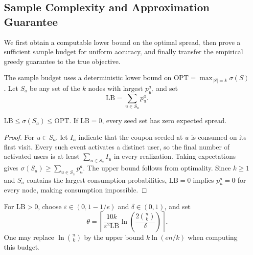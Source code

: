 \documentclass[sigconf]{acmart}
\begin{document}
\subsection{Sample Complexity and Approximation Guarantee}
\label{sec:theoretical-guarantees}

We first obtain a computable lower bound on the optimal spread,
then prove a sufficient sample budget for uniform accuracy, and
finally transfer the empirical greedy guarantee to the true objective.

The sample budget uses a deterministic lower bound on
$\mathrm{OPT}=\max_{|S|=k}\sigma(S)$. Let $S_a$ be any set of
the $k$ nodes with largest $p_u^a$, and set
\begin{equation}
\label{eq:opt-lower-bound}
  \mathrm{LB}=\sum_{u\in S_a}p_u^a.
\end{equation}

\begin{lemma}
\label{lem:lower-bound}
$\mathrm{LB}\le\sigma(S_a)\le\mathrm{OPT}$.
If $\mathrm{LB}=0$, every seed set has zero expected spread.
\end{lemma}
\begin{proof}\renewcommand{\qedsymbol}{}
For $u\in S_a$, let $I_u$ indicate that the coupon seeded at $u$
is consumed on its first visit. Every such event activates a
distinct user, so the final number of activated users is at least
$\sum_{u\in S_a}I_u$ in every realization.
Taking expectations gives $\sigma(S_a)\ge\sum_{u\in S_a}p_u^a$.
The upper bound follows from optimality. Since $k\ge1$ and $S_a$
contains the largest consumption probabilities, $\mathrm{LB}=0$
implies $p_u^a=0$ for every node, making consumption impossible.
\end{proof}

For $\mathrm{LB}>0$, choose $\varepsilon\in(0,1-1/e)$ and
$\delta\in(0,1)$, and set
\begin{equation}
\label{eq:sample-budget}
 \theta=\left\lceil
 \frac{10k}{\varepsilon^2\mathrm{LB}}
 \ln\left(\frac{2\binom nk}{\delta}\right)
 \right\rceil.
\end{equation}
One may replace $\ln\binom nk$ by the upper bound $k\ln(en/k)$
when computing this budget.
\end{document}

